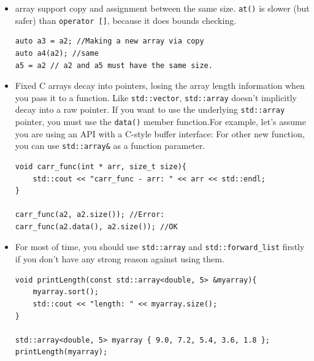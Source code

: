 \documentclass[a4paper,11pt,twoside]{book}
\begin{document}
\begin{itemize}
    \item array support copy and assignment between the same size. \texttt{at()} is slower (but safer) than \texttt{operator []}, because it does bounds checking. 
\begin{lstlisting}[numbers=none]
auto a3 = a2; //Making a new array via copy
auto a4(a2); //same
a5 = a2 // a2 and a5 must have the same size.  
\end{lstlisting}


    \item Fixed C arrays decay into pointers, losing the array length information when you pass it to a function. Like \texttt{std::vector}, \texttt{std::array} doesn't implicitly decay into a raw pointer. If you want to use the underlying \texttt{std::array} pointer, you must use the \texttt{data()} member function.For example, let's assume you are using an API with a C-style buffer interface: For other new function, you can use \texttt{std::array\&} as a function parameter. 

\begin{lstlisting}[numbers=none]
void carr_func(int * arr, size_t size){
    std::cout << "carr_func - arr: " << arr << std::endl;
}

carr_func(a2, a2.size()); //Error:
carr_func(a2.data(), a2.size()); //OK
\end{lstlisting}

    \item For most of time, you should use \texttt{std::array} and \texttt{std::forward\_list} firstly if you don't have any strong reason against using them.
\begin{lstlisting}[numbers=none]
void printLength(const std::array<double, 5> &myarray){
    myarray.sort();
    std::cout << "length: " << myarray.size();
}

std::array<double, 5> myarray { 9.0, 7.2, 5.4, 3.6, 1.8 };
printLength(myarray);
\end{lstlisting}

\end{itemize}
\end{document}
